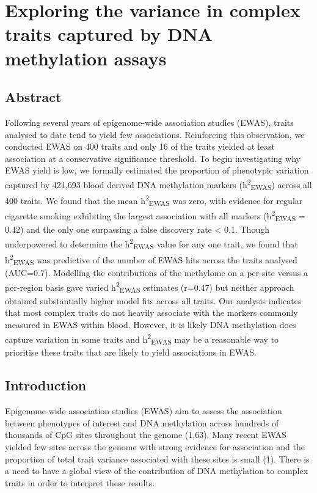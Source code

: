 \documentclass[11pt,oneside]{bristolthesis}
\begin{document}
\hypertarget{h2ewas-chapter}{%
\chapter{Exploring the variance in complex traits captured by DNA methylation assays}\label{h2ewas-chapter}}

\hypertarget{abstract-05}{%
\section{Abstract}\label{abstract-05}}

Following several years of epigenome-wide association studies (EWAS), traits analysed to date tend to yield few associations. Reinforcing this observation, we conducted EWAS on 400 traits and only 16 of the traits yielded at least association at a conservative significance threshold. To begin investigating why EWAS yield is low, we formally estimated the proportion of phenotypic variation captured by 421,693 blood derived DNA methylation markers (h\textsuperscript{2}\textsubscript{EWAS}) across all 400 traits. We found that the mean h\textsuperscript{2}\textsubscript{EWAS} was zero, with evidence for regular cigarette smoking exhibiting the largest association with all markers (h\textsuperscript{2}\textsubscript{EWAS} = 0.42) and the only one surpassing a false discovery rate \textless{} 0.1. Though underpowered to determine the h\textsuperscript{2}\textsubscript{EWAS} value for any one trait, we found that h\textsuperscript{2}\textsubscript{EWAS} was predictive of the number of EWAS hits across the traits analysed (AUC=0.7). Modelling the contributions of the methylome on a per-site versus a per-region basis gave varied h\textsuperscript{2}\textsubscript{EWAS} estimates (r=0.47) but neither approach obtained substantially higher model fits across all traits. Our analysis indicates that most complex traits do not heavily associate with the markers commonly measured in EWAS within blood. However, it is likely DNA methylation does capture variation in some traits and h\textsuperscript{2}\textsubscript{EWAS} may be a reasonable way to prioritise these traits that are likely to yield associations in EWAS.

\hypertarget{introduction-05}{%
\section{Introduction}\label{introduction-05}}

Epigenome-wide association studies (EWAS) aim to assess the association between phenotypes of interest and DNA methylation across hundreds of thousands of CpG sites throughout the genome (1,63). Many recent EWAS yielded few sites across the genome with strong evidence for association and the proportion of total trait variance associated with these sites is small (1). There is a need to have a global view of the contribution of DNA methylation to complex traits in order to interpret these results.
\end{document}
